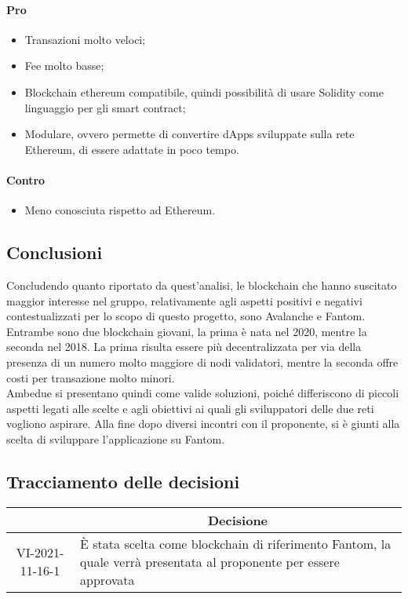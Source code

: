 		\paragraph{Pro}
		\begin{itemize}
			\item Transazioni molto veloci;
			\item Fee molto basse;
			\item Blockchain ethereum\glo{} compatibile, quindi possibilità di usare Solidity\glo{} come linguaggio per gli smart contract;
			\item Modulare, ovvero permette di convertire dApps sviluppate sulla rete Ethereum\glo{}, di essere adattate in poco tempo.
		\end{itemize}
		\paragraph{Contro}
		\begin{itemize}
			\item Meno conosciuta rispetto ad Ethereum\glo{}.
		\end{itemize}
	
	\subsection{Conclusioni}
	Concludendo quanto riportato da quest'analisi, le blockchain che hanno suscitato maggior interesse nel gruppo, relativamente agli aspetti positivi e negativi contestualizzati per lo scopo di questo progetto,
	sono Avalanche e Fantom. Entrambe sono due blockchain giovani, la prima è nata nel 2020, mentre la seconda nel 2018. La prima risulta essere più decentralizzata per via della presenza di un numero molto maggiore di nodi validatori, mentre la seconda
	offre costi per transazione molto minori.\\
	Ambedue si presentano quindi come valide soluzioni, poiché differiscono di piccoli aspetti legati alle scelte e agli obiettivi ai quali gli sviluppatori delle due reti vogliono aspirare. Alla fine dopo diversi incontri con il proponente, si è giunti
	alla scelta di sviluppare l'applicazione su Fantom.

\pagebreak

\subsection{Tracciamento delle decisioni}

\begin{table}[H]
	\centering
	\renewcommand{\arraystretch}{1.8}
	\begin{tabular}{c | p{10cm}}
		\rowcolor[HTML]{125E28}
		\multicolumn{1}{c}{\color[HTML]{FFFFFF} \textbf{ID}} &
		\multicolumn{1}{c}{\color[HTML]{FFFFFF} \textbf{Decisione}} \\
		\hline
		VI-2021-11-16-1 & È stata scelta come blockchain di riferimento Fantom, la quale verrà presentata al proponente per essere approvata\\ \hline
	\end{tabular}
\end{table}
